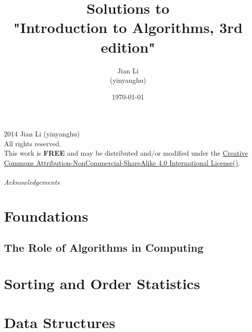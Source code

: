 \documentclass[11pt]{book}
\title{Solutions to\\"Introduction to Algorithms, 3rd edition"}
\author{Jian Li\\(yinyanghu)}
\date{\today}
\newcommand\yang[1]{\textbf{#1}}
\begin{document}
\frontmatter
\maketitle


\noindent\textcopyright{} 2014 Jian Li (yinyanghu)\\
All rights reserved.\\


\noindent This work is \yang{FREE} and may be distributed and/or modified under the \href{http://creativecommons.org/licenses/by-nc-sa/4.0/}{Creative Commons Attribution-NonCommercial-ShareAlike 4.0 International License(\ccbyncsa)}.\\

\paragraph{Acknowledgements}

\tableofcontents

\mainmatter

\part{Foundations}

\chapter{The Role of Algorithms in Computing}



\part{Sorting and Order Statistics}

\part{Data Structures}

\backmatter

\listoffigures
\listoftables
\end{document}
